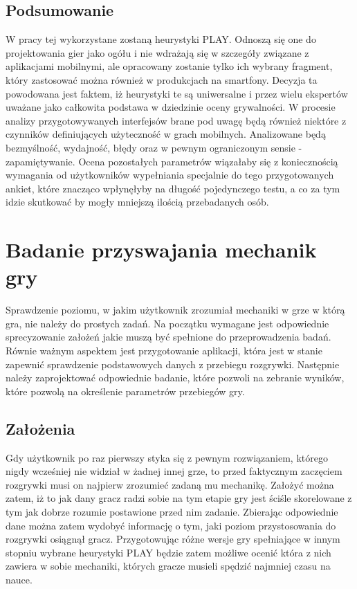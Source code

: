 \documentclass[a4paper,12pt,numbers=noenddot]{report}
\begin{document}
\section{Podsumowanie}
W pracy tej wykorzystane zostaną heurystyki PLAY. Odnoszą się one do projektowania gier jako ogółu i nie wdrażają się w szczegóły związane z aplikacjami mobilnymi, ale opracowany zostanie tylko ich wybrany fragment, który zastosować można również w produkcjach na smartfony. Decyzja ta powodowana jest faktem, iż heurystyki te są uniwersalne i przez wielu ekspertów uważane jako całkowita podstawa w dziedzinie oceny grywalności. W procesie analizy przygotowywanych interfejsów brane pod uwagę będą również niektóre z czynników definiujących użyteczność w grach mobilnych. Analizowane będą bezmyślność, wydajność, błędy oraz w pewnym ograniczonym sensie - zapamiętywanie. Ocena pozostałych parametrów wiązałaby się z koniecznością wymagania od użytkowników wypełniania specjalnie do tego przygotowanych ankiet, które znacząco wpłynęłyby na długość pojedynczego testu, a co za tym idzie skutkować by mogły mniejszą ilością przebadanych osób.

\chapter{Badanie przyswajania mechanik gry}
Sprawdzenie poziomu, w jakim użytkownik zrozumiał mechaniki w grze w którą gra, nie należy do prostych zadań. Na początku wymagane jest odpowiednie sprecyzowanie założeń jakie muszą być spełnione do przeprowadzenia badań. Równie ważnym aspektem jest przygotowanie aplikacji, która jest w stanie zapewnić sprawdzenie podstawowych danych z przebiegu rozgrywki. Następnie należy zaprojektować odpowiednie badanie, które pozwoli na zebranie wyników, które pozwolą na określenie parametrów przebiegów gry.
\section{Założenia}
Gdy użytkownik po raz pierwszy styka się z pewnym rozwiązaniem, którego nigdy wcześniej nie widział w żadnej innej grze, to przed faktycznym zaczęciem rozgrywki musi on najpierw zrozumieć zadaną mu mechanikę. Założyć można zatem, iż to jak dany gracz radzi sobie na tym etapie gry jest ściśle skorelowane z tym jak dobrze rozumie postawione przed nim zadanie. Zbierając odpowiednie dane można zatem wydobyć informację o tym, jaki poziom przystosowania do rozgrywki osiągnął gracz. Przygotowując różne wersje gry spełniające w innym stopniu wybrane heurystyki PLAY będzie zatem możliwe ocenić która z nich zawiera w sobie mechaniki, których gracze musieli spędzić najmniej czasu na nauce.
\end{document}
